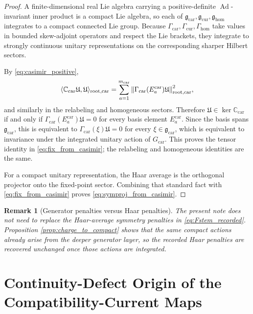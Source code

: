 \documentclass[11pt]{article}
\newcommand{\RootTensor}{\mathfrak U}
\newcommand{\TensorSymGroup}{G_{\mathrm{car}}}
\newcommand{\TensorChargeAlg}{\mathfrak g_{\mathrm{car}}}
\newcommand{\CurChargeAlg}{\mathfrak g_{\mathrm{cur}}}
\newcommand{\HomChargeAlg}{\mathfrak g_{\mathrm{hom}}}
\newcommand{\TensorGen}{\Gamma_{\mathrm{car}}}
\newcommand{\CurGen}{\Gamma_{\mathrm{cur}}}
\newcommand{\HomGen}{\Gamma_{\mathrm{hom}}}
\newcommand{\TensorCasimir}{\mathbb C_{\mathrm{car}}}
\newtheorem{remark}{Remark}
\begin{document}
\begin{proof}
A finite-dimensional real Lie algebra carrying a positive-definite \(\operatorname{Ad}\)-invariant inner product is a compact Lie algebra, so each of \(\TensorChargeAlg,\CurChargeAlg,\HomChargeAlg\) integrates to a compact connected Lie group. Because \(\TensorGen,\CurGen,\HomGen\) take values in bounded skew-adjoint operators and respect the Lie brackets, they integrate to strongly continuous unitary representations on the corresponding sharper Hilbert sectors.

By \eqref{eq:casimir_positive},
\[
\langle \TensorCasimir\RootTensor,\RootTensor\rangle_{\mathrm{root,car}}
=
\sum_{a=1}^{m_{\mathrm{car}}}
\norm{\TensorGen(E_a^{\mathrm{car}})\RootTensor}_{\mathrm{root,car}}^2,
\]
and similarly in the relabeling and homogeneous sectors. Therefore \(\RootTensor\in\ker\TensorCasimir\) if and only if \(\TensorGen(E_a^{\mathrm{car}})\RootTensor=0\) for every basis element \(E_a^{\mathrm{car}}\). Since the basis spans \(\TensorChargeAlg\), this is equivalent to \(\TensorGen(\xi)\RootTensor=0\) for every \(\xi\in\TensorChargeAlg\), which is equivalent to invariance under the integrated unitary action of \(\TensorSymGroup\). This proves the tensor identity in \eqref{eq:fix_from_casimir}; the relabeling and homogeneous identities are the same.

For a compact unitary representation, the Haar average is the orthogonal projector onto the fixed-point sector. Combining that standard fact with \eqref{eq:fix_from_casimir} proves \eqref{eq:symproj_from_casimir}.
\end{proof}

\begin{remark}[Generator penalties versus Haar penalties]
\label{rem:generator_vs_haar}
The present note does not need to replace the Haar-average symmetry penalties in \eqref{eq:Fstem_recorded}. Proposition \ref{prop:charge_to_compact} shows that the same compact actions already arise from the deeper generator layer, so the recorded Haar penalties are recovered unchanged once those actions are integrated.
\end{remark}

\section{Continuity-Defect Origin of the Compatibility-Current Maps}
\end{document}
